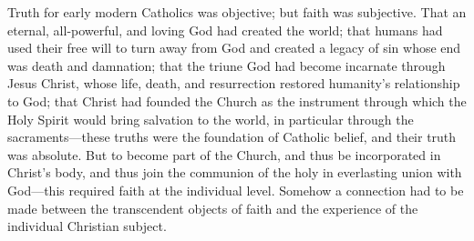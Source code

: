 
Truth for early modern Catholics was objective; but faith was subjective.
That an eternal, all-powerful, and loving God had created the world; that humans had used their free will to turn away from God and created a legacy of sin whose end was death and damnation; that the triune God had become incarnate through Jesus Christ, whose life, death, and resurrection restored humanity's relationship to God; that Christ had founded the Church as the instrument through which the Holy Spirit would bring salvation to the world, in particular through the sacraments---these truths were the foundation of Catholic belief, and their truth was absolute.
But to become part of the Church, and thus be incorporated in Christ's body, and thus join the communion of the holy in everlasting union with God---this required faith at the individual level.
Somehow a connection had to be made between the transcendent objects of faith and the experience of the individual Christian subject.
